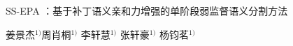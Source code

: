 {%
  \centering
  \vspace {11mm}
  \begin{CJK*}{UTF8}{zhhei}
  {
     SS-EPA ：基于补丁语义亲和力增强的单阶段弱监督语义分割方法
  }
  \end{CJK*}

  \vskip 5mm

  {
    \centering
    \begin{CJK*}{UTF8}{song}
      姜景杰$^{1)}$\quad  周肖桐$^{1)}$ \quad 李轩慧$^{1)}$ \quad 张轩豪$^{1)}$ \quad 杨钧茗$^{1)}$
    \end{CJK*}
  }

  \vspace {5mm}


  \vskip 5mm
}

